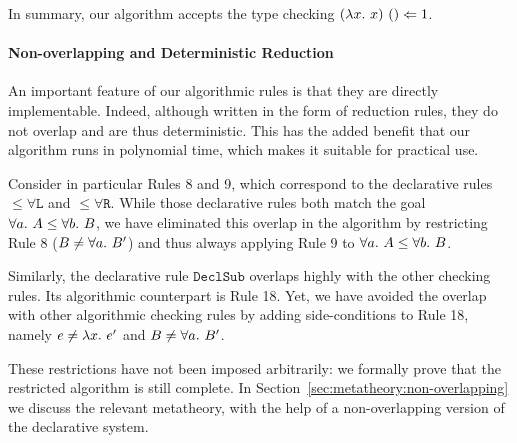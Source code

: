 In summary, our algorithm accepts the type checking $(\lam x)~() \Lto 1$.

\paragraph{Non-overlapping and Deterministic Reduction}
An important feature of our algorithmic rules is that they are directly
implementable. Indeed, although written in the form of reduction rules, they do
not overlap and are thus deterministic.  This has the added benefit that our
algorithm runs in polynomial time, which makes it suitable for practical use.

Consider in particular Rules 8 and 9, which correspond to the declarative rules
$\mathtt{{\le}\forall L}$ and $\mathtt{{\le}\forall R}$. While those
declarative rules both match the goal $\all A\le \all[b]B$,
we have eliminated this overlap in the algorithm by restricting Rule 8
($B\neq\all B'$) and thus always applying Rule 9 to $\all A\le \all[b]B$.

Similarly, the declarative rule $\mathtt{DeclSub}$ overlaps highly with the
other checking rules. Its algorithmic counterpart is Rule 18. Yet, we have
avoided the overlap with other algorithmic checking rules by adding
side-conditions to Rule 18, namely $e\neq\lam e'$ and $B\neq\all B'$.

These restrictions have not been imposed arbitrarily:
we formally prove that the restricted algorithm is still complete.
In Section~\ref{sec:metatheory:non-overlapping} we discuss the relevant metatheory,
with the help of a non-overlapping version of the declarative system.

